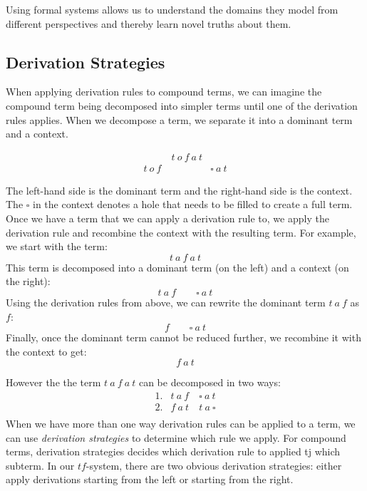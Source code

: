 Using formal systems allows us to understand the domains they model from
different perspectives and thereby learn novel truths about them.

\subsection{Derivation Strategies}

When applying derivation rules to compound terms, we can imagine the 
compound term being decomposed into simpler terms until one of the 
derivation rules applies. When we decompose a term, we separate it into a
dominant term and a context.

\begin{figure}[!h]\label{fig:decomposing}
\[
\begin{array}{lcr}
  & t\ o\ f\ a\ t \\
  t\ o\ f\ && \square\ a\ t 
\end{array}
\]
\end{figure}

The left-hand side is the dominant term and the right-hand side is the context. 
The $\square$ in the context denotes a hole that needs to be filled to create a full term.
Once we have a term that we can apply a derivation rule to, 
we apply the derivation rule and recombine the context with the resulting term. 
For example, we start with the term:
\[
  t\ a\ f\ a\ t
\]
This term is decomposed into a dominant term (on the left) and a context (on the right):
\[
  t\ a\ f \quad\quad \square\ a\ t
\]
Using the derivation rules from above, we can rewrite the dominant term $t\ a\ f$ as $f$:
\[
  f \quad\quad \square\ a\ t
\]
Finally, once the dominant term cannot be reduced further, we recombine it with the context to get:
\[
  f\ a\ t
\]

However the the term $t\ a\ f\ a\ t$ can be decomposed in two ways:
\[
\begin{array}{rlr}
  1. & t\ a\ f\ & \square\ a\ t  \\
  2. & f\ a\ t & t\ a\ \square  \\
\end{array}
\]
When we have more than one way derivation rules can be applied to a term,
we can use \emph{derivation strategies} to determine which rule we apply.
For compound terms, derivation strategies decides which derivation rule to applied tj which subterm.
In our $tf$-system, there are two obvious derivation strategies:
either apply derivations starting from the left or starting from the right.

